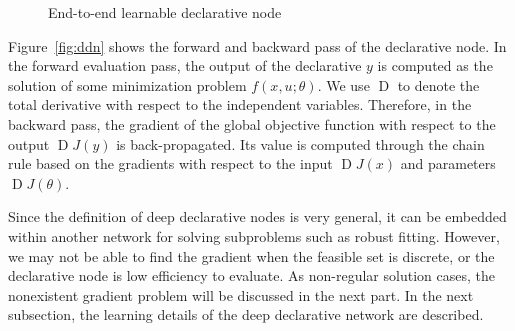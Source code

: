 \begin{figure}

    \caption{End-to-end learnable declarative node}
\end{figure}
\par Figure~\ref{fig:ddn} shows the forward and backward pass of the declarative node. In the forward evaluation pass, the output of the declarative $y$ is computed as the solution of some minimization problem $f(x, u; \theta)$. We use $\operatorname{D}$ to denote the total derivative with respect to the independent variables. Therefore, in the backward pass, the gradient of the global objective function with respect to the output $\operatorname{D}J(y)$ is back-propagated. Its value is computed through the chain rule based on the gradients with respect to the input $\operatorname{D}J(x)$ and parameters $\operatorname{D}J(\theta)$.
\par Since the definition of deep declarative nodes is very general, it can be embedded within another network for solving subproblems such as robust fitting. However, we may not be able to find the gradient when the feasible set is discrete, or the declarative node is low efficiency to evaluate. As non-regular solution cases, the nonexistent gradient problem will be discussed in the next part. In the next subsection, the learning details of the deep declarative network are described. 

